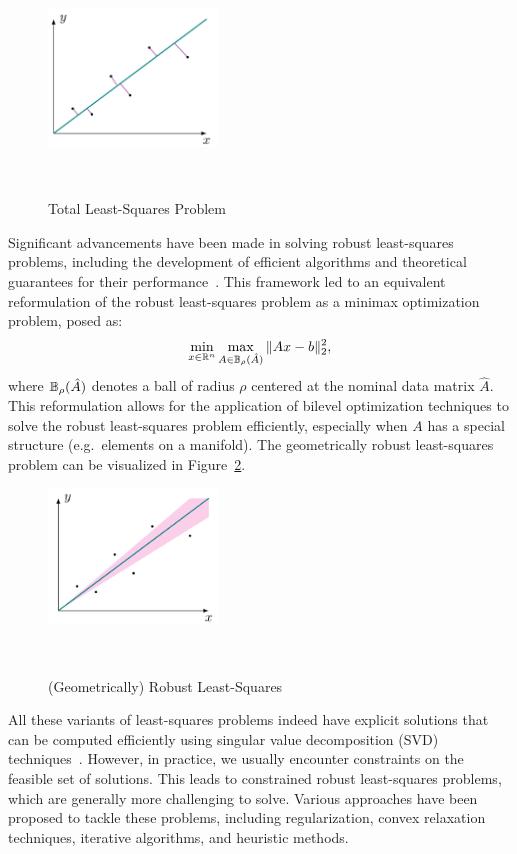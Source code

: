 \begin{figure}[h]
    \centering
    \includegraphics[width=0.4\textwidth]{figures/total-lsq.png}
    \caption{Total Least-Squares Problem}~\label{fig:total-lsq}
\end{figure}

Significant advancements have been made in solving robust least-squares problems, including the development of efficient algorithms and theoretical guarantees for their performance~\cite{ghaoui97}. This framework led to an equivalent reformulation of the robust least-squares problem as a minimax optimization problem, posed as:
\[\min_{x \in \mathbb{R}^n} \max_{A \in \mathbb{B}_{\rho}(\hat{A})} \|Ax - b\|_2^2,\]
where \(\mathbb{B}_{\rho}(\hat{A})\) denotes a ball of radius \(\rho\) centered at the nominal data matrix \(\hat{A}\). This reformulation allows for the application of bilevel optimization techniques to solve the robust least-squares problem efficiently, especially when $A$ has a special structure (e.g.\ elements on a manifold). The geometrically robust least-squares problem can be visualized in Figure~\ref{fig:robust-lsq}.

\begin{figure}[h]
    \centering
    \includegraphics[width=0.4\textwidth]{figures/robust-lsq.png}
    \caption{(Geometrically) Robust Least-Squares}~\label{fig:robust-lsq}
\end{figure}

All these variants of least-squares problems indeed have explicit solutions that can be computed efficiently using singular value decomposition (SVD) techniques~\cite{golub1980}. However, in practice, we usually encounter constraints on the feasible set of solutions. This leads to constrained robust least-squares problems, which are generally more challenging to solve. Various approaches have been proposed to tackle these problems, including regularization, convex relaxation techniques, iterative algorithms, and heuristic methods.

